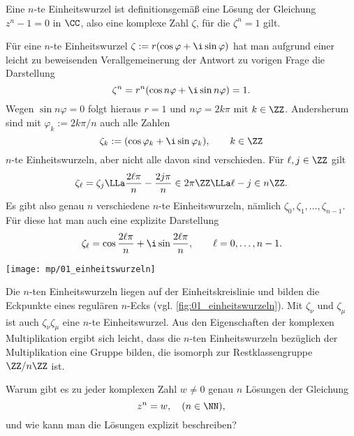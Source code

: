 \begin{antwort}
  Eine $n$-te Einheitswurzel ist definitionsgemäß eine Lösung der 
  Gleichung $z^n-1=0$ in $\CC$, also eine komplexe Zahl $\zeta$, für 
  die $\zeta^n=1$ gilt. 

  Für eine $n$-te Einheitswurzel 
  $\zeta := r(\cos \varphi + \i\sin\varphi)$ 
  hat man aufgrund einer leicht zu beweisenden Verallgemeinerung der Antwort 
  zu vorigen Frage die Darstellung
  \[
  \zeta^n = r^n (\cos n\varphi + \i \sin n \varphi)=1.
  \]
  Wegen $\sin n \varphi=0$ folgt hieraus 
  $r=1$ und $n\varphi=2k\pi$ mit $k\in \ZZ$. 
  Andersherum sind mit $\varphi_k := 2k\pi/n$ auch alle Zahlen
  \[
  \zeta_k := ( \cos \varphi_k + \i \sin  \varphi_k), \qquad k\in\ZZ
  \]
  $n$-te Einheitswurzeln, aber nicht alle davon sind verschieden. 
  Für $\ell,j \in \ZZ$ gilt
  \[
  \zeta_\ell = \zeta_j \LLa \frac{2\ell\pi}{n} - 
  \frac{2j\pi}{n} \in 2\pi\ZZ 
  \LLa \ell - j \in n\ZZ.
  \]
  Es gibt also genau $n$ verschiedene $n$-te Einheitswurzeln, 
  nämlich 
  $\zeta_0, \zeta_1, \ldots, \zeta_{n-1}$. 
  Für diese hat man auch eine 
  explizite Darstellung
  \begin{equation*}
    \zeta_\ell = \cos \frac{2\ell\pi}{n} + \i \sin  
    \frac{2 \ell \pi }{n},\qquad 
    \ell=0,\ldots,n-1.
  \end{equation*}

  \begin{center}
    \texttt{[image: mp/01\_einheitswurzeln]}
    \label{fig:01_einheitswurzeln}
  \end{center}

  Die $n$-ten Einheitswurzeln liegen auf der Einheitskreislinie und 
  bilden die Eckpunkte eines regulären $n$-Ecks (vgl. \Abb\ref{fig:01_einheitswurzeln}). 
  Mit $\zeta_\nu$ und $\zeta_\mu$ ist 
  auch $\zeta_\nu \zeta_\mu$ eine $n$-te Einheitswurzel. 
  Aus den Eigenschaften der komplexen Multiplikation 
  ergibt sich leicht, dass die $n$-ten Einheitswurzeln bezüglich 
  der Multiplikation eine Gruppe bilden, die isomorph 
  zur Restklassengruppe $\ZZ/n\ZZ$ ist. \AntEnd
\end{antwort}






\begin{frage}
  Warum gibt es zu jeder komplexen Zahl $w\not=0$ genau $n$ Lösungen 
  der Gleichung 
  \[
  z^n=w, \quad( n\in\NN),
  \]
  und wie kann man die Lösungen explizit beschreiben?
\end{frage}

